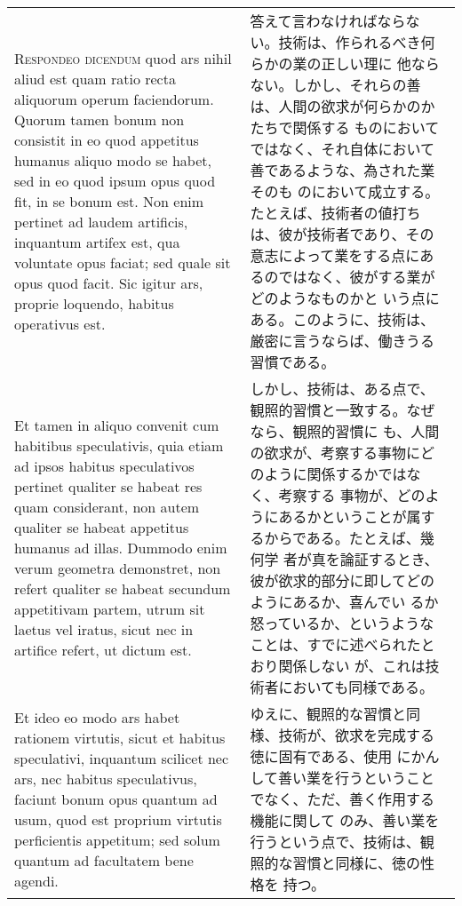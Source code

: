 \documentclass[10pt]{jsarticle}
\begin{document}
\begin{longtable}{p{21em}p{21em}}
\\

{\scshape Respondeo dicendum} quod ars nihil aliud est quam ratio
recta aliquorum operum faciendorum. Quorum tamen bonum non consistit
in eo quod appetitus humanus aliquo modo se habet, sed in eo quod
ipsum opus quod fit, in se bonum est. Non enim pertinet ad laudem
artificis, inquantum artifex est, qua voluntate opus faciat; sed quale
sit opus quod facit. Sic igitur ars, proprie loquendo, habitus
operativus est.

&

答えて言わなければならない。技術は、作られるべき何らかの業の正しい理に
他ならない。しかし、それらの善は、人間の欲求が何らかのかたちで関係する
ものにおいてではなく、それ自体において善であるような、為された業そのも
のにおいて成立する。たとえば、技術者の値打ちは、彼が技術者であり、その
意志によって業をする点にあるのではなく、彼がする業がどのようなものかと
いう点にある。このように、技術は、厳密に言うならば、働きうる習慣である。

\\

Et tamen in aliquo convenit cum habitibus speculativis, quia etiam ad
ipsos habitus speculativos pertinet qualiter se habeat res quam
considerant, non autem qualiter se habeat appetitus humanus ad
illas. Dummodo enim verum geometra demonstret, non refert qualiter se
habeat secundum appetitivam partem, utrum sit laetus vel iratus, sicut
nec in artifice refert, ut dictum est.

&

しかし、技術は、ある点で、観照的習慣と一致する。なぜなら、観照的習慣に
も、人間の欲求が、考察する事物にどのように関係するかではなく、考察する
事物が、どのようにあるかということが属するからである。たとえば、幾何学
者が真を論証するとき、彼が欲求的部分に即してどのようにあるか、喜んでい
るか怒っているか、というようなことは、すでに述べられたとおり関係しない
が、これは技術者においても同様である。

\\

Et ideo eo modo ars habet rationem virtutis, sicut et habitus
speculativi, inquantum scilicet nec ars, nec habitus speculativus,
faciunt bonum opus quantum ad usum, quod est proprium virtutis
perficientis appetitum; sed solum quantum ad facultatem bene agendi.

&

ゆえに、観照的な習慣と同様、技術が、欲求を完成する徳に固有である、使用
にかんして善い業を行うということでなく、ただ、善く作用する機能に関して
のみ、善い業を行うという点で、技術は、観照的な習慣と同様に、徳の性格を
持つ。


\end{longtable}
\end{document}
